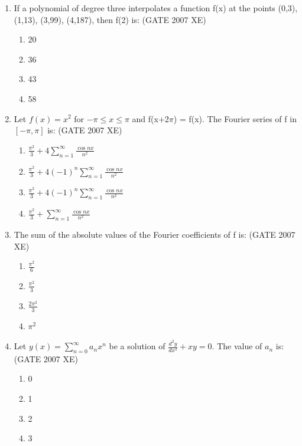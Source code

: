 \documentclass[journal,cmex10]{IEEEtran}
\theoremstyle{remark}
\numberwithin{equation}{enumi}
\numberwithin{figure}{enumi}
\begin{document}
\begin{enumerate}
    \item If a polynomial of degree three interpolates a function f(x) at the points (0,3), (1,13), (3,99), (4,187), then f(2) is:
    \hfill{(GATE 2007 XE)}
    \begin{multicols}{4}
    \begin{enumerate}
        \item 20
        \item 36
        \item 43
        \item 58
    \end{enumerate}
\end{multicols}

    \item Let $f(x) = x^2$ for $-\pi \leq x \leq \pi$ and f(x+2$\pi$) = f(x). The Fourier series of f in $[-\pi,\pi]$ is:
    \hfill{(GATE 2007 XE)}
    \begin{multicols}{2}
    \begin{enumerate}
        \item $\frac{\pi^2}{3} + 4 \sum_{n=1}^{\infty} \frac{\cos nx}{n^2}$
        \item $\frac{\pi^2}{3} + 4 (-1)^n \sum_{n=1}^{\infty} \frac{\cos nx}{n^2}$       
        \item $\frac{\pi^2}{3} + 4 (-1)^n \sum_{n=1}^{\infty} \frac{\cos nx}{n^2}$
        \item $\frac{\pi^2}{3} + \sum_{n=1}^{\infty} \frac{\cos nx}{n^2}$
    \end{enumerate}
\end{multicols}

    \item The sum of the absolute values of the Fourier coefficients of f is:
    \hfill{(GATE 2007 XE)}
    \begin{multicols}{4}
    \begin{enumerate}
        \item $\frac{\pi^2}{6}$
        \item $\frac{\pi^2}{3}$
        \item $\frac{2\pi^2}{3}$
        \item $\pi^2$
    \end{enumerate}
    \end{multicols}

    \item Let $y(x) = \sum_{n=0}^{\infty} a_n x^n$ be a solution of $ \frac{d^2 y}{dx^2} + x y = 0$. The value of $a_n$ is:\\
    \hfill{(GATE 2007 XE)}
    \begin{multicols}{4}
    \begin{enumerate}
        \item 0
        \item 1
        \item 2
        \item 3
    \end{enumerate}
\end{multicols}


\end{enumerate}
\end{document}
